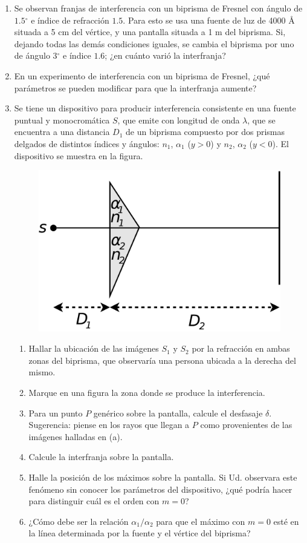 \documentclass[11pt,spanish,a4paper]{article}
\begin{document}
\begin{enumerate}
\item Se observan franjas de interferencia con un biprisma de Fresnel con
ángulo de $1.5{}^{\circ}$ e índice de refracción $1.5$. Para esto
se usa una fuente de luz de 4000 Å situada a 5 cm del vértice, y una
pantalla situada a 1 m del biprisma. Si, dejando todas las demás condiciones
iguales, se cambia el biprisma por uno de ángulo 3$^{\circ}$ e índice
$1.6$; ¿en cuánto varió la interfranja?
\item En un experimento de interferencia con un biprisma de Fresnel, ¿qué
parámetros se pueden modificar para que la interfranja aumente?
\item Se tiene un dispositivo para producir interferencia consistente en
una fuente puntual y monocromática $S$, que emite con longitud de
onda $\lambda$, que se encuentra a una distancia $D_{1}$ de un biprisma
compuesto por dos prismas delgados de distintos índices y ángulos:
$n_{1}$, $\alpha_{1}$ ($y>0$) y $n_{2}$, $\alpha_{2}$ ($y<0$).
El dispositivo se muestra en la figura.
\begin{figure}[H]
\centering{}\includegraphics[clip,scale=0.3]{ej5-15}
\end{figure}


\begin{enumerate}
\item Hallar la ubicación de las imágenes $S_{1}$ y $S_{2}$ por la refracción
en ambas zonas del biprisma, que observaría una persona ubicada a
la derecha del mismo. 
\item Marque en una figura la zona donde se produce la interferencia.
\item Para un punto $P$ genérico sobre la pantalla, calcule el desfasaje
$\delta$. Sugerencia: piense en los rayos que llegan a $P$ como
provenientes de las imágenes halladas en (a).
\item Calcule la interfranja sobre la pantalla. 
\item Halle la posición de los máximos sobre la pantalla. Si Ud. observara
este fenómeno sin conocer los parámetros del dispositivo, ¿qué podría
hacer para distinguir cuál es el orden con $m=0$? 
\item ¿Cómo debe ser la relación $\alpha_{1}/\alpha_{2}$ para que el máximo
con $m=0$ esté en la línea determinada por la fuente y el vértice
del biprisma?
\end{enumerate}



\end{enumerate}
\end{document}
